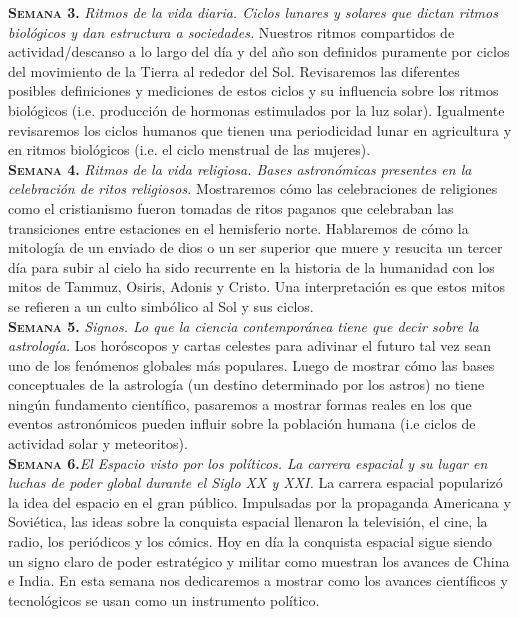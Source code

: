 \documentclass[letterpaper,10pt,onecolumn]{article}
\begin{document}
\noindent\textbf{\textsc{Semana 3.}} \textit{Ritmos de la vida diaria. Ciclos
lunares y solares que dictan ritmos biol\'ogicos y
dan estructura a sociedades.} Nuestros ritmos compartidos de
actividad/descanso a lo largo del d\'ia y del a\~no son definidos puramente por ciclos del
movimiento de la Tierra al rededor del Sol. Revisaremos las diferentes
posibles definiciones y mediciones de estos ciclos y su influencia
sobre los ritmos biol\'ogicos (i.e. producci\'on de hormonas
estimulados por la luz solar). Igualmente revisaremos los ciclos
humanos que tienen una periodicidad lunar en agricultura y en ritmos
biol\'ogicos (i.e. el ciclo menstrual de las mujeres). \\[-0.3cm]  

\noindent\textbf{\textsc{Semana 4.}} \textit{Ritmos de la vida
religiosa. Bases astron\'omicas presentes en la celebraci\'on de ritos
religiosos.} Mostraremos c\'omo las celebraciones de religiones
como el cristianismo  fueron tomadas de ritos paganos que celebraban las
transiciones entre estaciones en el hemisferio norte.  Hablaremos de
c\'omo la mitolog\'ia de un enviado de dios o un ser 
superior que muere y resucita un tercer d\'ia para subir al cielo ha
sido recurrente en la historia de la humanidad con los mitos de
Tammuz, Osiris, Adonis y Cristo. Una interpretaci\'on es que estos
mitos se  refieren a un culto simb\'olico al Sol y sus ciclos.  \\[-0.3cm] 

\noindent\textbf{\textsc{Semana 5.}} \textit{Signos. Lo que la ciencia
contempor\'anea tiene que decir sobre la astrolog\'ia.} Los
hor\'oscopos y cartas celestes para adivinar el futuro tal vez sean
uno de los fen\'omenos globales m\'as populares. Luego de
mostrar c\'omo las bases conceptuales de la astrolog\'ia (un destino
determinado por los astros) no tiene ning\'un fundamento cient\'ifico,
pasaremos a mostrar formas reales en los que eventos astron\'omicos pueden
influir sobre la poblaci\'on humana (i.e ciclos de actividad solar y
meteoritos).\\[-0.3cm]  

\noindent\textbf{\textsc{Semana 6.}}\textit{El Espacio visto por los
pol\'iticos. La carrera espacial y su lugar en luchas de poder global
durante el Siglo XX y XXI.} La carrera espacial populariz\'o la idea
del espacio en el gran p\'ublico. Impulsadas por la propaganda
Americana y Sovi\'etica, las ideas sobre la conquista espacial
llenaron la televisi\'on, el cine, la radio, los peri\'odicos y los
c\'omics. Hoy en d\'ia la conquista espacial sigue siendo un signo
claro de poder estrat\'egico y militar como muestran los avances de
China e India. En esta semana nos dedicaremos a mostrar como los
avances cient\'ificos y tecnol\'ogicos se usan como un instrumento
pol\'itico. \\[-0.3cm]  
\end{document}
